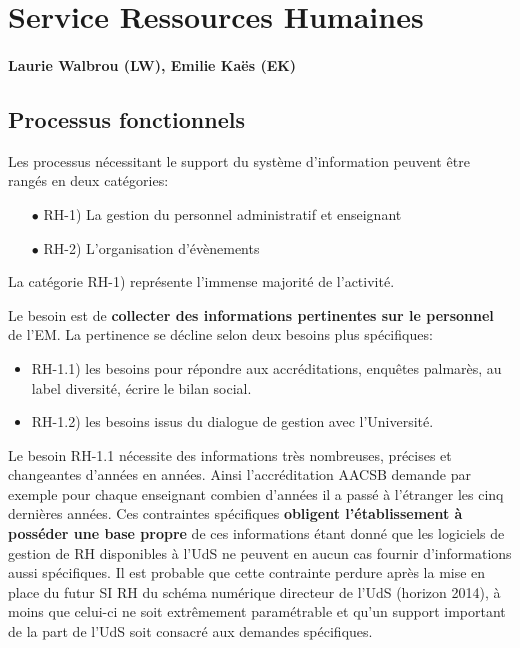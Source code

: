 \documentclass{book}
\begin{document}
	


\section{Service Ressources Humaines}

\paragraph{Laurie Walbrou (LW), Emilie Kaës (EK)}


\subsection{Processus fonctionnels}
\label{sc:rh-process}
Les processus nécessitant le support du système d'information peuvent 
être rangés en deux catégories:
\begin{itemize}
\item[$\bullet$] RH-1) La gestion du personnel administratif et enseignant
\item[$\bullet$] RH-2) L'organisation d'évènements
\end{itemize}
\bigskip

La catégorie RH-1) représente l'immense majorité de l'activité.

Le besoin est de \textbf{collecter des informations pertinentes
sur le personnel} de l'EM. La pertinence se décline selon
deux besoins plus spécifiques:
\begin{itemize}
\item RH-1.1) les besoins pour répondre aux accréditations, enquêtes 
	palmarès, au label diversité, écrire le bilan social.
\item RH-1.2) les besoins issus du dialogue de gestion avec l'Université.
\end{itemize}

\bigskip

Le besoin RH-1.1 nécessite des informations très nombreuses, précises
et changeantes d'années en années. Ainsi l'accréditation AACSB demande
par exemple pour chaque enseignant combien d'années il a passé à l'étranger 
les cinq dernières années. Ces contraintes spécifiques \textbf{obligent 
l'établissement à posséder une base propre} de ces informations étant donné 
que les logiciels de gestion de RH disponibles à l'UdS ne peuvent en aucun
cas fournir d'informations aussi spécifiques. Il est probable que cette
contrainte perdure après la mise en place du futur SI RH du schéma numérique
directeur de l'UdS (horizon 2014), à moins que celui-ci ne soit extrêmement 
paramétrable et qu'un support important de la part de l'UdS soit consacré 
aux demandes spécifiques.\\
\end{document}
